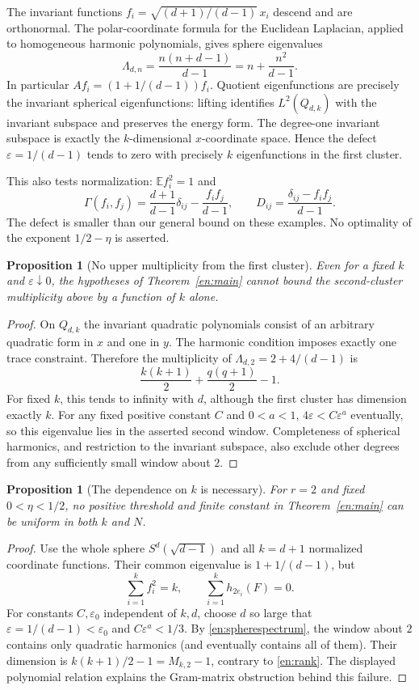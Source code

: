 \documentclass[12pt]{amsart}
\newtheorem{prop}[thm]{Proposition}
\theoremstyle{definition}
\theoremstyle{remark}
\numberwithin{equation}{section}
\newcommand{\E}{\mathbb E}
\newcommand{\eps}{\varepsilon}
\theoremstyle{plain}
\begin{document}
The invariant functions
$f_i=\sqrt{(d+1)/(d-1)}\,x_i$ descend and are orthonormal.
The polar-coordinate formula for the Euclidean Laplacian, applied to
homogeneous harmonic polynomials, gives sphere eigenvalues
\begin{equation}\label{en:spherespectrum}
 \Lambda_{d,n}=\frac{n(n+d-1)}{d-1}=n+\frac{n^2}{d-1}.
\end{equation}
In particular $Af_i=(1+1/(d-1))f_i$. Quotient eigenfunctions are precisely
the invariant spherical eigenfunctions: lifting identifies $L^2(Q_{d,k})$
with the invariant subspace and preserves the energy form.
The degree-one invariant subspace is exactly the $k$-dimensional
$x$-coordinate space. Hence the defect $\eps=1/(d-1)$ tends to zero
with precisely $k$ eigenfunctions in the first cluster.

This also tests normalization: $\E f_i^2=1$ and
\[
 \Gamma(f_i,f_j)=\frac{d+1}{d-1}\delta_{ij}
                    -\frac{f_if_j}{d-1},\qquad
 D_{ij}=\frac{\delta_{ij}-f_if_j}{d-1}.
\]
The defect is smaller than our general bound on these examples.
No optimality of the exponent $1/2-\eta$ is asserted.

\begin{prop}[No upper multiplicity from the first cluster]\label{en:noupper}
Even for a fixed $k$ and $\eps\downarrow0$, the hypotheses of
Theorem~\ref{en:main} cannot bound the second-cluster multiplicity
above by a function of $k$ alone.
\end{prop}
\begin{proof}
On $Q_{d,k}$ the invariant quadratic polynomials consist of an arbitrary
quadratic form in $x$ and one in $y$. The harmonic condition imposes
exactly one trace constraint. Therefore the multiplicity of
$\Lambda_{d,2}=2+4/(d-1)$ is
\[
 \frac{k(k+1)}2+\frac{q(q+1)}2-1.
\]
For fixed $k$, this tends to infinity with $d$, although the first
cluster has dimension exactly $k$. For any fixed positive constant $C$
and $0<a<1$, $4\eps<C\eps^a$ eventually, so this eigenvalue lies
in the asserted second window. Completeness of spherical harmonics,
and restriction to the invariant subspace, also exclude other degrees
from any sufficiently small window about $2$.
\end{proof}

\begin{prop}[The dependence on $k$ is necessary]\label{en:knecessary}
For $r=2$ and fixed $0<\eta<1/2$, no positive threshold and finite
constant in Theorem~\ref{en:main} can be uniform in both $k$ and $N$.
\end{prop}
\begin{proof}
Use the whole sphere $S^d(\sqrt{d-1})$ and all $k=d+1$ normalized
coordinate functions. Their common eigenvalue is $1+1/(d-1)$, but
\[
 \sum_{i=1}^k f_i^2=k,\qquad
 \sum_{i=1}^k h_{2e_i}(F)=0.
\]
For constants $C,\eps_0$ independent of $k,d$, choose $d$ so large that
$\eps=1/(d-1)<\eps_0$ and $C\eps^a<1/3$.
By \eqref{en:spherespectrum}, the window about $2$ contains only
quadratic harmonics (and eventually contains all of them).
Their dimension is $k(k+1)/2-1=M_{k,2}-1$, contrary to
\eqref{en:rank}. The displayed polynomial relation explains the
Gram-matrix obstruction behind this failure.
\end{proof}
\end{document}
